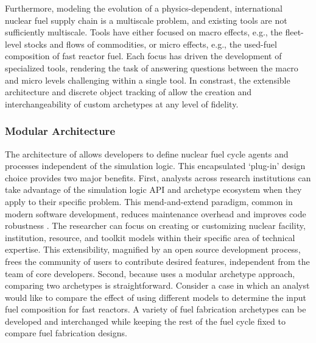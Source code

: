 Furthermore, modeling the evolution of a physics-dependent, international nuclear fuel supply
chain is a multiscale problem, and existing tools are not sufficiently 
multiscale. Tools have either focused on macro effects, e.g., the fleet-level
stocks and flows of commodities, or micro effects, e.g., the used-fuel
composition of fast reactor fuel. Each focus has driven the
development of specialized tools, rendering the task of answering questions between
the macro and micro levels challenging within a single tool. 
In constrast, the extensible architecture and discrete object tracking of \Cyclus allow
the creation and interchangeability of custom archetypes at any level of fidelity.


\subsubsection{Modular Architecture}

The architecture of \Cyclus allows developers 
to define nuclear fuel cycle agents and processes independent of the simulation 
logic. This encapsulated `plug-in'
design choice provides two major benefits. First, analysts across research institutions can take advantage of the 
simulation logic \gls{API} and archetype ecosystem when they apply \Cyclus to 
their specific problem. This 
mend-and-extend paradigm, common in modern software development, reduces 
maintenance overhead and improves code robustness \cite{citation_needed}. 
The researcher can focus on creating or customizing nuclear 
facility, institution, resource, and toolkit models within their specific area 
of technical expertise. This extensibility, magnified by an open source 
development process, frees the community of users to contribute desired 
features, independent from the team of \Cyclus core developers. 
Second, because \Cyclus uses a modular archetype approach, comparing two 
archetypes is straightforward. Consider a case in which an analyst would like 
to compare the effect of using different models to determine the input fuel 
composition for fast reactors. A variety of fuel fabrication archetypes can be 
developed and interchanged while keeping the rest of the fuel cycle fixed
 to compare fuel fabrication designs.

